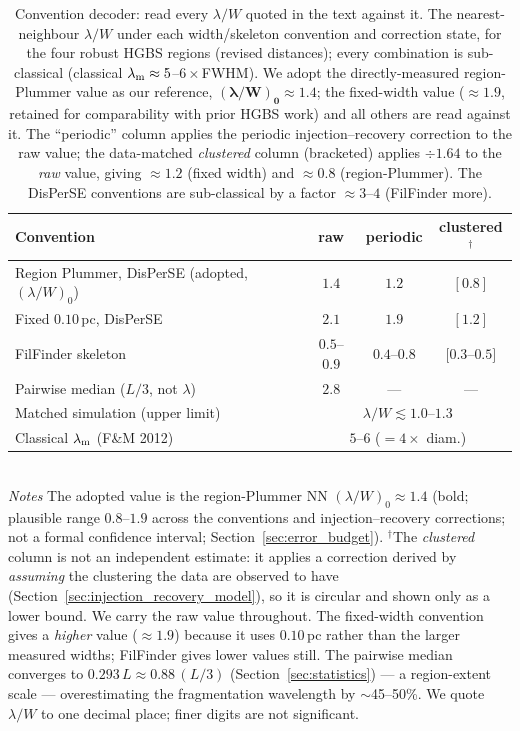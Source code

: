 \documentclass[usenatbib,twoside,twocolumn]{mnras}
\begin{document}
\begin{table}
\caption{Convention decoder: read every $\lambda/W$ quoted in the text against it. The nearest-neighbour $\lambda/W$ under each width/skeleton convention and correction state, for the four robust HGBS regions (revised distances); every combination is sub-classical (classical $\lambda_{\rm m}\approx5$--$6\times$FWHM). We adopt the directly-measured region-Plummer value as our reference, $\boldsymbol{(\lambda/W)_0\approx1.4}$; the fixed-width value ($\approx1.9$, retained for comparability with prior HGBS work) and all others are read against it. The ``periodic'' column applies the periodic injection--recovery correction to the raw value; the data-matched \emph{clustered} column (bracketed) applies $\div1.64$ to the \emph{raw} value, giving $\approx1.2$ (fixed width) and $\approx0.8$ (region-Plummer). The DisPerSE conventions are sub-classical by a factor $\approx3$--$4$ (FilFinder more).}
\label{tab:headline}
\footnotesize
\setlength{\tabcolsep}{4pt}
\begin{tabular}{p{3.6cm}ccc}
\toprule
Convention & raw & periodic & clustered$^{\dagger}$ \\
\midrule
Region Plummer, DisPerSE (adopted, $(\lambda/W)_0$) & $\mathbf{1.4}$ & $1.2$ & $[0.8]$ \\
Fixed $0.10$\,pc, DisPerSE & $2.1$ & $1.9$ & $[1.2]$ \\
FilFinder skeleton & $0.5$--$0.9$ & $0.4$--$0.8$ & $[0.3$--$0.5]$ \\
Pairwise median ($L/3$, not $\lambda$) & $2.8$ & --- & --- \\
\midrule
Matched simulation (upper limit) & \multicolumn{3}{c}{$\lambda/W\lesssim1.0$--$1.3$} \\
Classical $\lambda_{\rm m}$ (F\&M 2012) & \multicolumn{3}{c}{$5$--$6$ ($=4\times$ diam.)} \\
\bottomrule
\end{tabular}
\\[2pt]
\footnotesize
\emph{Notes} The adopted value is the region-Plummer NN $(\lambda/W)_0\approx1.4$ (bold; plausible range $0.8$--$1.9$ across the conventions and injection--recovery corrections; not a formal confidence interval; Section~\ref{sec:error_budget}). $^{\dagger}$The \emph{clustered} column is not an independent estimate: it applies a correction derived by \emph{assuming} the clustering the data are observed to have (Section~\ref{sec:injection_recovery_model}), so it is circular and shown only as a lower bound. We carry the raw value throughout. The fixed-width convention gives a \emph{higher} value ($\approx1.9$) because it uses $0.10$\,pc rather than the larger measured widths; FilFinder gives lower values still. The pairwise median converges to $0.293\,L\approx0.88\,(L/3)$ (Section~\ref{sec:statistics}) --- a region-extent scale --- overestimating the fragmentation wavelength by $\sim$45--50\%. We quote $\lambda/W$ to one decimal place; finer digits are not significant.
\end{table}
\end{document}
